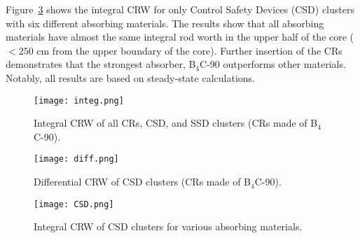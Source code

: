 Figure~\ref{fig:CSD} shows the integral CRW for only Control Safety Devices (CSD) clusters with six 
different absorbing materials. The results show that all absorbing materials 
have almost the same integral rod worth in the upper half of the core 
($<250$ cm from the upper boundary of the core). Further insertion of the 
CRs demonstrates that the strongest absorber, B$_4$C-90 outperforms other materials.
Notably, all results are based on steady-state calculations. 

\begin{figure}
	\centering
	\texttt{[image: integ.png]}
	\vspace{-0.5in}
	\caption{Integral CRW of all CRs, CSD, and SSD clusters (CRs made of B$_4$C-90).} 
	\label{fig:integ}
\end{figure}
\begin{figure}
	\centering
	\texttt{[image: diff.png]}
	\vspace{-0.5in}
	\caption{Differential CRW of CSD clusters (CRs made of B$_4$C-90).} 
	\label{fig:diff}
\end{figure}
\begin{figure}
	\centering
	\texttt{[image: CSD.png]}
	\vspace{-0.5in}
	\caption{Integral CRW of CSD clusters for various absorbing materials.} 
	\label{fig:CSD}
\end{figure}